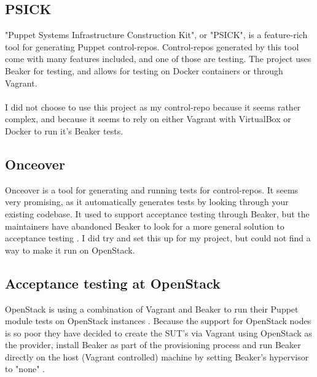 \subsection{PSICK}

"Puppet Systems Infrastructure Construction Kit"\cite{psickgithub}, or "PSICK", is a feature-rich tool for generating Puppet control-repos. Control-repos generated by this tool come with many features included, and one of those are testing. The project uses Beaker for testing, and allows for testing on Docker containers or through Vagrant.
\\
\\
I did not choose to use this project as my control-repo because it seems rather complex, and because it seems to rely on either Vagrant with VirtualBox or Docker to run it's Beaker tests.

\subsection{Onceover}

Onceover\cite{onceovergithub} is a tool for generating and running tests for control-repos. It seems very promising, as it automatically generates tests by looking through your existing codebase. It used to support acceptance testing through Beaker, but the maintainers have abandoned Beaker to look for a more general solution to acceptance testing \cite{onceoverbeakerpr}. I did try and set this up for my project, but could not find a way to make it run on OpenStack.

\subsection{Acceptance testing at OpenStack}

OpenStack is using a combination of Vagrant and Beaker to run their Puppet module tests on OpenStack instances \cite{puppetmodulefunctionaltestingbeakerinsidevagrant}\cite{openstackpuppetmodulefunctionaltestingproposal}. Because the support for OpenStack nodes is so poor they have decided to create the SUT's via Vagrant using OpenStack as the provider, install Beaker as part of the provisioning process and run Beaker directly on the host (Vagrant controlled) machine by setting Beaker's hypervisor to "none" \cite{puppetmodulefunctionaltestingbeakerinsidevagrantnodeexample}\cite{openstackci}.


